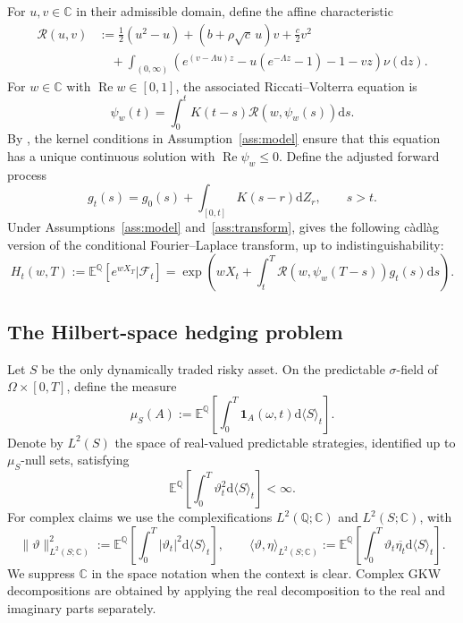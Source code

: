 \documentclass[11pt]{article}
\theoremstyle{definition}
\theoremstyle{remark}
\newcommand{\C}{\mathbb{C}}
\newcommand{\E}{\mathbb{E}}
\newcommand{\Q}{\mathbb{Q}}
\newcommand{\F}{\mathcal{F}}
\newcommand{\Rr}{\mathcal{R}}
\newcommand{\1}{\mathbf{1}}
\newcommand{\dd}{\mathrm{d}}
\begin{document}
For $u,v\in\C$ in their admissible domain, define the affine characteristic
\begin{align}
\Rr(u,v)
&:=\frac12(u^2-u)+(b+\rho\sqrt c\,u)v+\frac c2v^2
\nonumber\\
&\quad+\int_{(0,\infty)}
 \left(e^{(v-\Lambda u)z}-u(e^{-\Lambda z}-1)-1-vz\right)\nu(\dd z).
\label{eq:R-map}
\end{align}
For $w\in\C$ with $\operatorname{Re}w\in[0,1]$, the associated
Riccati--Volterra equation is
\begin{equation}
\label{eq:riccati-volterra}
 \psi_w(t)=\int_0^tK(t-s)\Rr(w,\psi_w(s))\dd s.
\end{equation}
By \citet[Theorem~3.1]{bondi2024}, the kernel conditions in
Assumption~\ref{ass:model} ensure that this equation has a unique continuous
solution with $\operatorname{Re}\psi_w\leq0$. Define the adjusted forward process
\begin{equation}
\label{eq:adjusted-forward}
 g_t(s)=g_0(s)+\int_{[0,t]}K(s-r)\dd Z_r,
 \qquad s>t.
\end{equation}
Under Assumptions~\ref{ass:model} and~\ref{ass:transform},
\citet[Theorem~3.3]{bondi2024} gives the following c\`adl\`ag version of the
conditional Fourier--Laplace transform, up to indistinguishability:
\begin{equation}
\label{eq:H-affine}
H_t(w,T):=\E^\Q[e^{wX_T}|\F_t]
=\exp\left(
  wX_t+\int_t^T\Rr(w,\psi_w(T-s))g_t(s)\dd s
\right).
\end{equation}

\subsection{The Hilbert-space hedging problem}

Let $S$ be the only dynamically traded risky asset. On the predictable
$\sigma$-field of $\Omega\times[0,T]$, define the measure
\[
 \mu_S(A):=\E^\Q\!\left[\int_0^T
   \mathbf 1_A(\omega,t)\dd\langle S\rangle_t\right].
\]
Denote by $L^2(S)$ the space of real-valued predictable strategies, identified up to
$\mu_S$-null sets, satisfying
\[
 \E^\Q\left[\int_0^T\vartheta_t^2\dd\langle S\rangle_t\right]<\infty.
\]
For complex claims we use the complexifications $L^2(\Q;\C)$ and
$L^2(S;\C)$, with
\[
 \|\vartheta\|_{L^2(S;\C)}^2
 :=\E^\Q\left[\int_0^T|\vartheta_t|^2\dd\langle S\rangle_t\right],
 \qquad
 \langle\vartheta,\eta\rangle_{L^2(S;\C)}
 :=\E^\Q\left[\int_0^T\vartheta_t\overline{\eta_t}\dd\langle S\rangle_t\right].
\]
We suppress $\C$ in the space notation when the context is clear. Complex
GKW decompositions are obtained by applying the real decomposition to the
real and imaginary parts separately.
\end{document}
